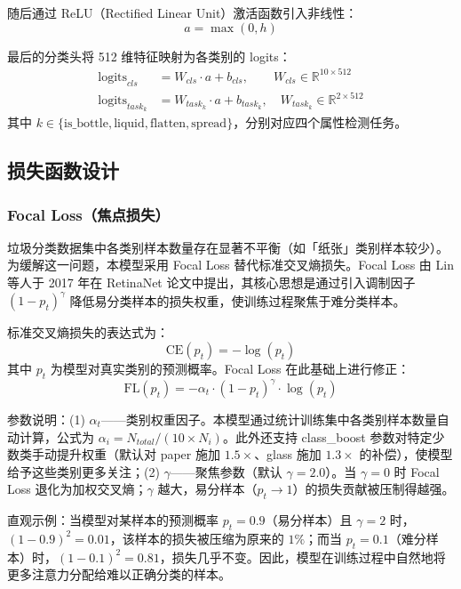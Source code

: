 \documentclass[11pt,a4paper]{ctexart}
\newcommand{\rb}[1]{\ensuremath{\mathbb{R}^{#1}}}
\begin{document}
随后通过 ReLU（Rectified Linear Unit）激活函数引入非线性：
\begin{equation}
a = \max(0, h)
\end{equation}

最后的分类头将 512 维特征映射为各类别的 logits：
\begin{align}
\text{logits}_{cls} &= W_{cls} \cdot a + b_{cls}, \qquad W_{cls} \in \rb{10 \times 512} \\
\text{logits}_{task_k} &= W_{task_k} \cdot a + b_{task_k}, \quad W_{task_k} \in \rb{2 \times 512}
\end{align}
其中 $k \in \{\text{is\_bottle}, \text{liquid}, \text{flatten}, \text{spread}\}$，分别对应四个属性检测任务。

\subsection{损失函数设计}

\subsubsection{Focal Loss（焦点损失）}

垃圾分类数据集中各类别样本数量存在显著不平衡（如「纸张」类别样本较少）。为缓解这一问题，本模型采用 Focal Loss 替代标准交叉熵损失。Focal Loss 由 Lin 等人于 2017 年在 RetinaNet 论文中提出，其核心思想是通过引入调制因子 $(1-p_t)^\gamma$ 降低易分类样本的损失权重，使训练过程聚焦于难分类样本。

标准交叉熵损失的表达式为：
\begin{equation}
\mathrm{CE}(p_t) = -\log(p_t)
\end{equation}
其中 $p_t$ 为模型对真实类别的预测概率。Focal Loss 在此基础上进行修正：
\begin{equation}
\mathrm{FL}(p_t) = -\alpha_t \cdot (1-p_t)^\gamma \cdot \log(p_t)
\end{equation}

参数说明：(1) $\alpha_t$——类别权重因子。本模型通过统计训练集中各类别样本数量自动计算，公式为 $\alpha_i = N_{total} / (10 \times N_i)$。此外还支持 class\_boost 参数对特定少数类手动提升权重（默认对 paper 施加 $1.5\times$、glass 施加 $1.3\times$ 的补偿），使模型给予这些类别更多关注；(2) $\gamma$——聚焦参数（默认 $\gamma = 2.0$）。当 $\gamma = 0$ 时 Focal Loss 退化为加权交叉熵；$\gamma$ 越大，易分样本（$p_t \to 1$）的损失贡献被压制得越强。

直观示例：当模型对某样本的预测概率 $p_t = 0.9$（易分样本）且 $\gamma = 2$ 时，$(1-0.9)^2 = 0.01$，该样本的损失被压缩为原来的 $1\%$；而当 $p_t = 0.1$（难分样本）时，$(1-0.1)^2 = 0.81$，损失几乎不变。因此，模型在训练过程中自然地将更多注意力分配给难以正确分类的样本。
\end{document}
